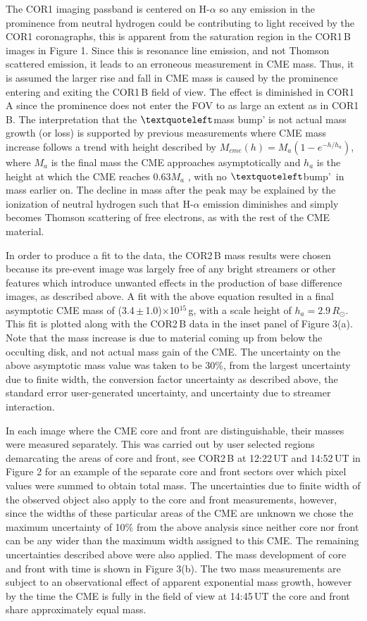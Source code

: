 \documentclass{emulateapj}
\begin{document}
The COR1 imaging passband is centered on H-$\alpha$ so any emission in the prominence from neutral hydrogen could be contributing to light received by the COR1 coronagraphs, this is apparent from the saturation region in the COR1\,B images in Figure 1. Since this is resonance line emission, and not Thomson scattered emission, it leads to an erroneous measurement in CME mass. Thus, it is assumed the larger rise and fall in CME mass is caused by the prominence entering and exiting the COR1\,B field of view. The effect is diminished in COR1\,A since the prominence does not enter the FOV to as large an extent as in COR1\,B. The interpretation that the $\textquoteleft$mass bump' is not actual mass growth (or loss) is supported by previous measurements where CME mass increase follows a trend with height described by $M_{cme}(h)=M_{a}(1-e^{-h/h_a})$, where $M_a$ is the final mass the CME approaches asymptotically and $h_a$ is the height at which the CME reaches 0.63$M_a$ \citep{cola09}, with no  $\textquoteleft$bump'~in mass earlier on. The decline in mass after the peak may be explained by the ionization of neutral hydrogen such that H-$\alpha$ emission diminishes and simply becomes Thomson scattering of free electrons, as with the rest of the CME material. 

In order to produce a fit to the data, the COR2\,B mass results were chosen because its pre-event image was largely free of any bright streamers or other features which introduce unwanted effects in the production of base difference images, as described above. A fit with the above equation resulted in a final asymptotic CME mass of (3.4\,$\pm$\,1.0)$\times$10$^{15}$\,g, with a scale height of $h_a=2.9\,R_{\odot}$. This fit is plotted along with the COR2\,B data in the inset panel of Figure 3(a). Note that the mass increase is due to material coming up from below the occulting disk, and not actual mass gain of the CME. The uncertainty on the above asymptotic mass value was taken to be 30\%, from the largest uncertainty due to finite width, the conversion factor uncertainty as described above, the standard error user-generated uncertainty, and uncertainty due to streamer interaction.

In each image where the CME core and front are distinguishable, their masses were measured separately. This was carried out by user selected regions demarcating the areas of core and front, see COR2\,B at 12:22\,UT and 14:52\,UT in Figure 2 for an example of the separate core and front sectors over which pixel values were summed to obtain total mass. The uncertainties due to finite width of the observed object also apply to the core and front measurements, however, since the widths of these particular areas of the CME are unknown we chose the maximum uncertainty of 10\% from the above analysis since neither core nor front can be any wider than the maximum width assigned to this CME. The remaining uncertainties described above were also applied. The mass development of core and front with time is shown in Figure 3(b). The two mass measurements are subject to an observational effect of apparent exponential mass growth, however by the time the CME is fully in the field of view at 14:45\,UT the core and front share approximately equal mass. 
\end{document}
